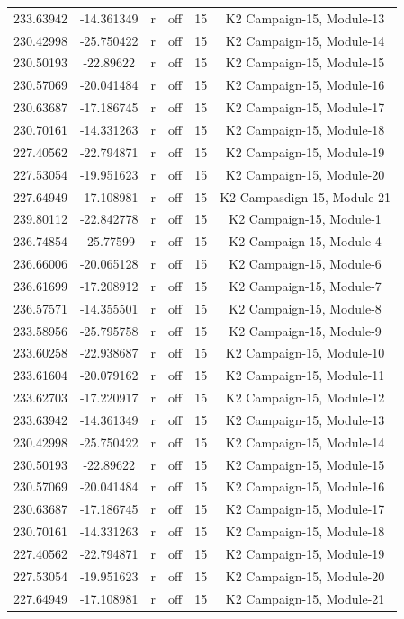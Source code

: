 \documentclass[11pt]{article}
\begin{document}
\begin{center}
\begin{longtable}{|c|c|c|c|c|c|}
233.63942 & -14.361349 & r & off &15 & K2 Campaign-15, Module-13\\
230.42998 & -25.750422 & r & off &15 & K2 Campaign-15, Module-14\\
230.50193 & -22.89622 & r & off &15 & K2 Campaign-15, Module-15\\
230.57069 & -20.041484 & r & off &15 & K2 Campaign-15, Module-16\\
230.63687 & -17.186745 & r & off &15 & K2 Campaign-15, Module-17\\
230.70161 & -14.331263 & r & off &15 & K2 Campaign-15, Module-18\\
227.40562 & -22.794871 & r & off &15 & K2 Campaign-15, Module-19\\
227.53054 & -19.951623 & r & off &15 & K2 Campaign-15, Module-20\\
227.64949 & -17.108981 & r & off &15 & K2 Campasdign-15, Module-21\\
239.80112 & -22.842778 & r & off &15 & K2 Campaign-15, Module-1\\
236.74854 & -25.77599 & r & off &15 & K2 Campaign-15, Module-4\\
236.66006 & -20.065128 & r & off &15 & K2 Campaign-15, Module-6\\
236.61699 & -17.208912 & r & off &15 & K2 Campaign-15, Module-7\\
236.57571 & -14.355501 & r & off &15 & K2 Campaign-15, Module-8\\
233.58956 & -25.795758 & r & off &15 & K2 Campaign-15, Module-9\\
233.60258 & -22.938687 & r & off &15 & K2 Campaign-15, Module-10\\
233.61604 & -20.079162 & r & off &15 & K2 Campaign-15, Module-11\\
233.62703 & -17.220917 & r & off &15 & K2 Campaign-15, Module-12\\
233.63942 & -14.361349 & r & off &15 & K2 Campaign-15, Module-13\\
230.42998 & -25.750422 & r & off &15 & K2 Campaign-15, Module-14\\
230.50193 & -22.89622 & r & off &15 & K2 Campaign-15, Module-15\\
230.57069 & -20.041484 & r & off &15 & K2 Campaign-15, Module-16\\
230.63687 & -17.186745 & r & off &15 & K2 Campaign-15, Module-17\\
230.70161 & -14.331263 & r & off &15 & K2 Campaign-15, Module-18\\
227.40562 & -22.794871 & r & off &15 & K2 Campaign-15, Module-19\\
227.53054 & -19.951623 & r & off &15 & K2 Campaign-15, Module-20\\
227.64949 & -17.108981 & r & off &15 & K2 Campaign-15, Module-21\\
\hline
\end{longtable}
\end{center}
\end{document}
